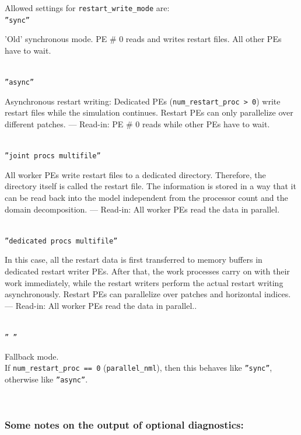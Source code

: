 Allowed settings for \texttt{restart\_write\_mode} are:\\[1em]
\texttt{''sync''} \\
\hspace*{2em}
\parbox{0.8\textwidth}{\raggedright%
  'Old' synchronous mode. PE \# 0 reads and writes restart files. All other PEs have to wait.}\\[1em]
%
\texttt{''async''} \\
\hspace*{2em}
\parbox{0.8\textwidth}{\raggedright%
  Asynchronous restart writing:
  Dedicated PEs (\texttt{num\_restart\_proc > 0}) write restart files
  while the simulation continues.  Restart PEs can only parallelize
  over different patches. --- Read-in: PE \# 0 reads while other PEs
  have to wait.  } \\[1em]
%
\texttt{''joint procs multifile''} \\
\hspace*{2em}
\parbox{0.8\textwidth}{\raggedright%
  All worker PEs write restart files to a dedicated
  directory. Therefore, the directory itself is called the restart
  file.  The information is stored in a way that it can be read back
  into the model independent from the processor count and the domain
  decomposition. --- Read-in: All worker PEs read the data in parallel.
 }\\[1em]
%
\texttt{''dedicated procs multifile''} \\
\hspace*{2em}
\parbox{0.8\textwidth}{\raggedright%

  In this case, all the restart data is first transferred to memory
  buffers in dedicated restart writer PEs.  After that, the work
  processes carry on with their work immediately, while the restart
  writers perform the actual restart writing asynchronously.  Restart
  PEs can parallelize over patches and horizontal indices.
  --- Read-in: All worker PEs read the data in parallel..
}\\[1em]
%
\texttt{'' ''} \\
\hspace*{2em}
\parbox{0.8\textwidth}{\raggedright%
  Fallback mode. \\ If \texttt{num\_restart\_proc == 0} (\texttt{parallel\_nml}),
  then this behaves like \texttt{''sync''}, otherwise like \texttt{''async''}.
}\\[1em]

\subsubsection{Some notes on the output of optional diagnostics:}\label{subsec:optdiagnostics}


